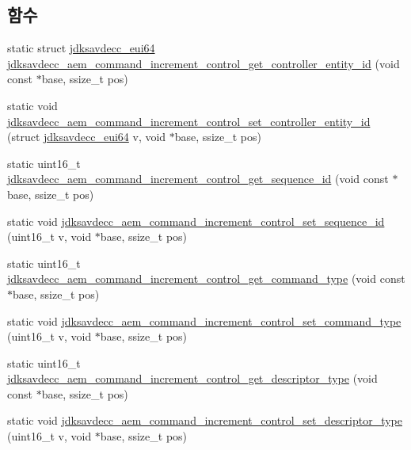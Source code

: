 \subsection*{함수}
\begin{DoxyCompactItemize}
\item 
static struct \hyperlink{structjdksavdecc__eui64}{jdksavdecc\+\_\+eui64} \hyperlink{group__command__increment__control_ga450930d81d05796d7e3189876a569ac9}{jdksavdecc\+\_\+aem\+\_\+command\+\_\+increment\+\_\+control\+\_\+get\+\_\+controller\+\_\+entity\+\_\+id} (void const $\ast$base, ssize\+\_\+t pos)
\item 
static void \hyperlink{group__command__increment__control_ga131b9d621884879f7f09645fdb8e1d7a}{jdksavdecc\+\_\+aem\+\_\+command\+\_\+increment\+\_\+control\+\_\+set\+\_\+controller\+\_\+entity\+\_\+id} (struct \hyperlink{structjdksavdecc__eui64}{jdksavdecc\+\_\+eui64} v, void $\ast$base, ssize\+\_\+t pos)
\item 
static uint16\+\_\+t \hyperlink{group__command__increment__control_gaf686723e77cda8737d80c270bc4080c1}{jdksavdecc\+\_\+aem\+\_\+command\+\_\+increment\+\_\+control\+\_\+get\+\_\+sequence\+\_\+id} (void const $\ast$base, ssize\+\_\+t pos)
\item 
static void \hyperlink{group__command__increment__control_gaeb4172322a4ac38ab9c07d9d089620db}{jdksavdecc\+\_\+aem\+\_\+command\+\_\+increment\+\_\+control\+\_\+set\+\_\+sequence\+\_\+id} (uint16\+\_\+t v, void $\ast$base, ssize\+\_\+t pos)
\item 
static uint16\+\_\+t \hyperlink{group__command__increment__control_ga3237e842fb913dc35a9d7d58d4474557}{jdksavdecc\+\_\+aem\+\_\+command\+\_\+increment\+\_\+control\+\_\+get\+\_\+command\+\_\+type} (void const $\ast$base, ssize\+\_\+t pos)
\item 
static void \hyperlink{group__command__increment__control_gae1515171333fb2df79a56a6563152f6a}{jdksavdecc\+\_\+aem\+\_\+command\+\_\+increment\+\_\+control\+\_\+set\+\_\+command\+\_\+type} (uint16\+\_\+t v, void $\ast$base, ssize\+\_\+t pos)
\item 
static uint16\+\_\+t \hyperlink{group__command__increment__control_ga4d1c2dffa148e378ddb53d256801b3cc}{jdksavdecc\+\_\+aem\+\_\+command\+\_\+increment\+\_\+control\+\_\+get\+\_\+descriptor\+\_\+type} (void const $\ast$base, ssize\+\_\+t pos)
\item 
static void \hyperlink{group__command__increment__control_gac3b9d3634e23837b45df8274444e8948}{jdksavdecc\+\_\+aem\+\_\+command\+\_\+increment\+\_\+control\+\_\+set\+\_\+descriptor\+\_\+type} (uint16\+\_\+t v, void $\ast$base, ssize\+\_\+t pos)

\end{DoxyCompactItemize}
